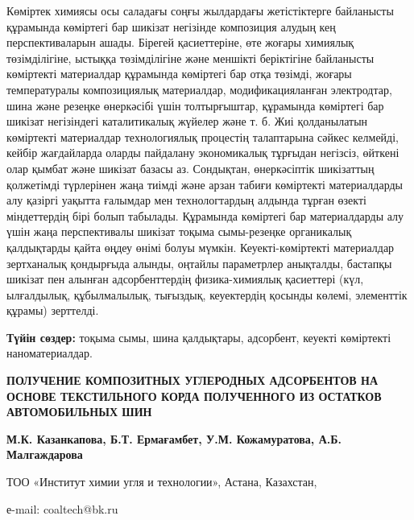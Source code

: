 Көміртек химиясы осы саладағы соңғы жылдардағы жетістіктерге байланысты
құрамында көміртегі бар шикізат негізінде композиция алудың кең
перспективаларын ашады. Бірегей қасиеттеріне, өте жоғары химиялық
төзімділігіне, ыстыққа төзімділігіне және меншікті беріктігіне
байланысты көміртекті материалдар құрамында көміртегі бар отқа төзімді,
жоғары температуралы композициялық материалдар, модификацияланған
электродтар, шина және резеңке өнеркәсібі үшін толтырғыштар, құрамында
көміртегі бар шикізат негізіндегі каталитикалық жүйелер және т. б. Жиі
қолданылатын көміртекті материалдар технологиялық процестің талаптарына
сәйкес келмейді, кейбір жағдайларда оларды пайдалану экономикалық
тұрғыдан негізсіз, өйткені олар қымбат және шикізат базасы аз.
Сондықтан, өнеркәсіптік шикізаттың қолжетімді түрлерінен жаңа тиімді
және арзан табиғи көміртекті материалдарды алу қазіргі уақытта ғалымдар
мен технологтардың алдында тұрған өзекті міндеттердің бірі болып
табылады. Құрамында көміртегі бар материалдарды алу үшін жаңа
перспективалы шикізат тоқыма сымы-резеңке органикалық қалдықтарды қайта
өңдеу өнімі болуы мүмкін. Кеуекті-көміртекті материалдар зертханалық
қондырғыда алынды, оңтайлы параметрлер анықталды, бастапқы шикізат пен
алынған адсорбенттердің физика-химиялық қасиеттері (күл, ылғалдылық,
құбылмалылық, тығыздық, кеуектердің қосынды көлемі, элементтік құрамы)
зерттелді.

{\bfseries Түйін сөздер:} тоқыма сымы, шина қалдықтары, адсорбент, кеуекті
көміртекті наноматериалдар.

\begin{center}
{\large\bfseries ПОЛУЧЕНИЕ КОМПОЗИТНЫХ УГЛЕРОДНЫХ АДСОРБЕНТОВ НА ОСНОВЕ
ТЕКСТИЛЬНОГО КОРДА ПОЛУЧЕННОГО ИЗ ОСТАТКОВ АВТОМОБИЛЬНЫХ ШИН}

{\bfseries М.К. Казанкапова, Б.Т. Ермағамбет, У.М. Кожамуратова, А.Б.
Малгаждарова}

ТОО «Институт химии угля и технологии», Астана, Казахстан,

е-mail: coaltech@bk.ru
\end{center}

